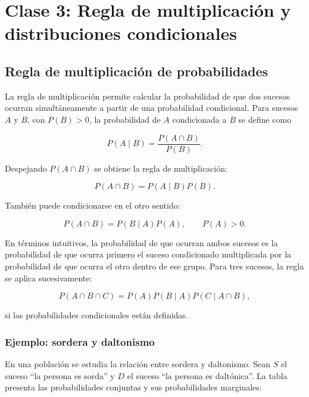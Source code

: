 \chapter{Clase 3: Regla de multiplicación y distribuciones condicionales}

\section{Regla de multiplicación de probabilidades}

La regla de multiplicación permite calcular la probabilidad de que dos sucesos ocurran simultáneamente a partir de una probabilidad condicional. Para sucesos $A$ y $B$, con $P(B)>0$, la probabilidad de $A$ condicionada a $B$ se define como

\begin{equation*}
P(A\mid B)=\frac{P(A\cap B)}{P(B)}.
\end{equation*}

Despejando $P(A\cap B)$ se obtiene la regla de multiplicación:

\begin{equation*}
P(A\cap B)=P(A\mid B)P(B).
\end{equation*}

También puede condicionarse en el otro sentido:

\begin{equation*}
P(A\cap B)=P(B\mid A)P(A),\qquad P(A)>0.
\end{equation*}

En términos intuitivos, la probabilidad de que ocurran ambos sucesos es la probabilidad de que ocurra primero el suceso condicionado multiplicada por la probabilidad de que ocurra el otro dentro de ese grupo. Para tres sucesos, la regla se aplica sucesivamente:

\begin{equation*}
P(A\cap B\cap C)=P(A)P(B\mid A)P(C\mid A\cap B),
\end{equation*}

si las probabilidades condicionales están definidas.

\subsection{Ejemplo: sordera y daltonismo}

En una población se estudia la relación entre sordera y daltonismo. Sean $S$ el suceso ``la persona es sorda'' y $D$ el suceso ``la persona es daltónica''. La tabla presenta las probabilidades conjuntas y sus probabilidades marginales:

